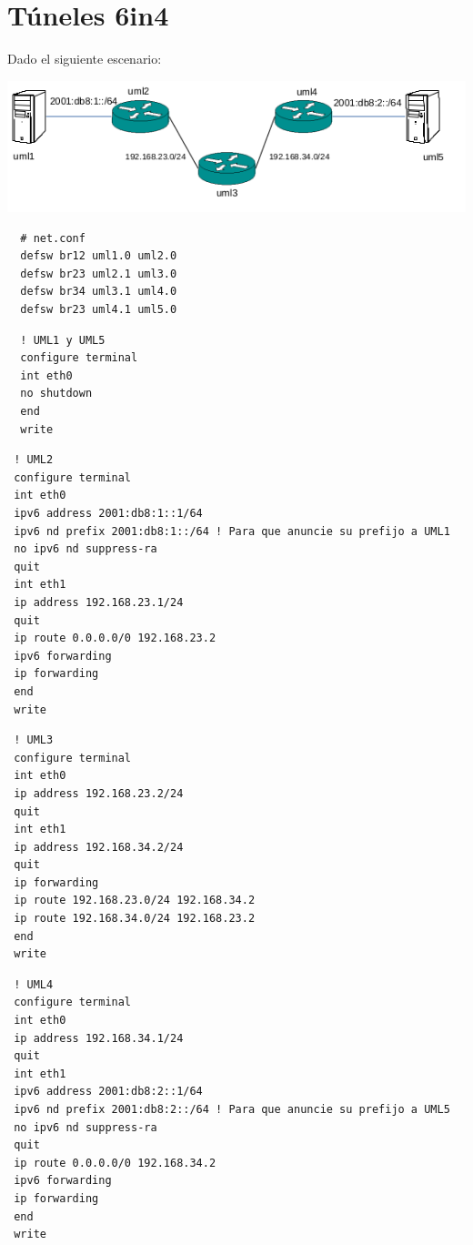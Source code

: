 \documentclass{article}
\begin{document}
\tableofcontents

\section{Túneles 6in4}
Dado el siguiente escenario:

\includegraphics[width=\textwidth]{tuneles6in4}

\begin{verbatim}
  # net.conf
  defsw br12 uml1.0 uml2.0
  defsw br23 uml2.1 uml3.0
  defsw br34 uml3.1 uml4.0
  defsw br23 uml4.1 uml5.0
\end{verbatim}

\begin{verbatim}
  ! UML1 y UML5
  configure terminal
  int eth0
  no shutdown
  end
  write
\end{verbatim}

\begin{verbatim}
 ! UML2
 configure terminal
 int eth0
 ipv6 address 2001:db8:1::1/64
 ipv6 nd prefix 2001:db8:1::/64 ! Para que anuncie su prefijo a UML1
 no ipv6 nd suppress-ra
 quit
 int eth1
 ip address 192.168.23.1/24
 quit
 ip route 0.0.0.0/0 192.168.23.2
 ipv6 forwarding
 ip forwarding
 end
 write
\end{verbatim}

\begin{verbatim}
 ! UML3
 configure terminal
 int eth0
 ip address 192.168.23.2/24
 quit
 int eth1
 ip address 192.168.34.2/24
 quit
 ip forwarding
 ip route 192.168.23.0/24 192.168.34.2
 ip route 192.168.34.0/24 192.168.23.2
 end
 write
\end{verbatim}

\begin{verbatim}
 ! UML4
 configure terminal
 int eth0
 ip address 192.168.34.1/24
 quit
 int eth1
 ipv6 address 2001:db8:2::1/64
 ipv6 nd prefix 2001:db8:2::/64 ! Para que anuncie su prefijo a UML5
 no ipv6 nd suppress-ra 
 quit
 ip route 0.0.0.0/0 192.168.34.2
 ipv6 forwarding
 ip forwarding
 end
 write
\end{verbatim}
\end{document}
